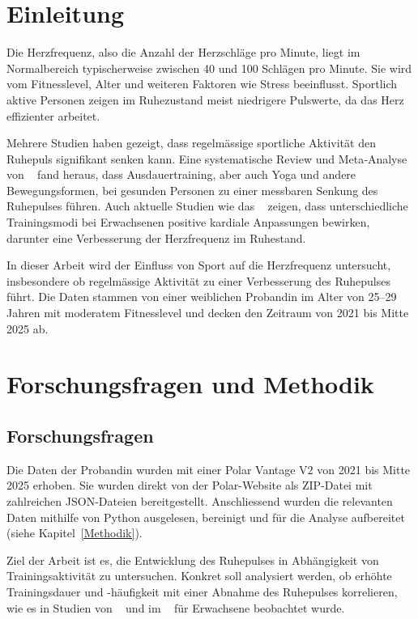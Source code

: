 \documentclass[a4paper,12pt]{scrartcl}
\begin{document}
 

\clearpage

\section{Einleitung}
\label{Kap1}
Die Herzfrequenz, also die Anzahl der Herzschläge pro Minute, liegt im Normalbereich typischerweise zwischen 40 und 100 Schlägen pro Minute. Sie wird vom Fitnesslevel, Alter und weiteren Faktoren wie Stress beeinflusst. Sportlich aktive Personen zeigen im Ruhezustand meist niedrigere Pulswerte, da das Herz effizienter arbeitet.  

Mehrere Studien haben gezeigt, dass regelmässige sportliche Aktivität den Ruhepuls signifikant senken kann. Eine systematische Review und Meta‑Analyse von ~\cite{Reimers2018} fand heraus, dass Ausdauertraining, aber auch Yoga und andere Bewegungsformen, bei gesunden Personen zu einer messbaren Senkung des Ruhepulses führen. Auch aktuelle Studien wie das ~\cite{Navarro2022} zeigen, dass unterschiedliche Trainingsmodi bei Erwachsenen positive kardiale Anpassungen bewirken, darunter eine Verbesserung der Herzfrequenz im Ruhestand.

In dieser Arbeit wird der Einfluss von Sport auf die Herzfrequenz untersucht, insbesondere ob regelmässige Aktivität zu einer Verbesserung des Ruhepulses führt. Die Daten stammen von einer weiblichen Probandin im Alter von 25–29 Jahren mit moderatem Fitnesslevel und decken den Zeitraum von 2021 bis Mitte 2025 ab. 


\section{Forschungsfragen und Methodik}
\subsection{Forschungsfragen}
Die Daten der Probandin wurden mit einer Polar Vantage V2 von 2021 bis Mitte 2025 erhoben. Sie wurden direkt von der Polar-Website als ZIP-Datei mit zahlreichen JSON-Dateien bereitgestellt. Anschliessend wurden die relevanten Daten mithilfe von Python ausgelesen, bereinigt und für die Analyse aufbereitet (siehe Kapitel~\ref{Methodik}).  

Ziel der Arbeit ist es, die Entwicklung des Ruhepulses in Abhängigkeit von Trainingsaktivität zu untersuchen. Konkret soll analysiert werden, ob erhöhte Trainingsdauer und -häufigkeit mit einer Abnahme des Ruhepulses korrelieren, wie es in Studien von ~\cite{Reimers2018} und im ~\cite{Navarro2022} für Erwachsene beobachtet wurde.
\end{document}
